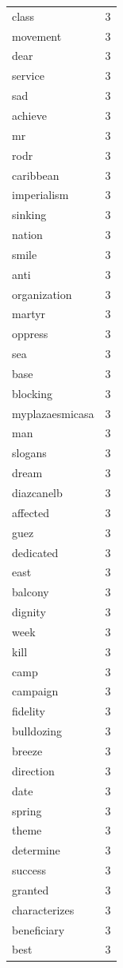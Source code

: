 \begin{tabular}{lr}
class & 3 \\
movement & 3 \\
dear & 3 \\
service & 3 \\
sad & 3 \\
achieve & 3 \\
mr & 3 \\
rodr & 3 \\
caribbean & 3 \\
imperialism & 3 \\
sinking & 3 \\
nation & 3 \\
smile & 3 \\
anti & 3 \\
organization & 3 \\
martyr & 3 \\
oppress & 3 \\
sea & 3 \\
base & 3 \\
blocking & 3 \\
myplazaesmicasa & 3 \\
man & 3 \\
slogans & 3 \\
dream & 3 \\
diazcanelb & 3 \\
affected & 3 \\
guez & 3 \\
dedicated & 3 \\
east & 3 \\
balcony & 3 \\
dignity & 3 \\
week & 3 \\
kill & 3 \\
camp & 3 \\
campaign & 3 \\
fidelity & 3 \\
bulldozing & 3 \\
breeze & 3 \\
direction & 3 \\
date & 3 \\
spring & 3 \\
theme & 3 \\
determine & 3 \\
success & 3 \\
granted & 3 \\
characterizes & 3 \\
beneficiary & 3 \\
best & 3 \\

\end{tabular}
